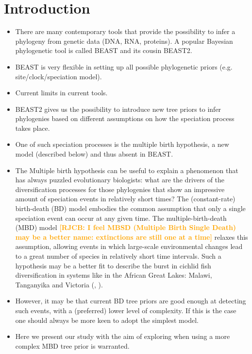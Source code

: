 \documentclass{article}
\newcommand*\richel[1]{\textcolor{orange}{\textbf{[RJCB: #1]}}}
\begin{document}
\section{Introduction}
\begin{itemize}

\item There are many contemporary tools that provide the possibility to infer a phylogeny from genetic data (DNA, RNA, proteins). A popular Bayesian
phylogenetic tool is called BEAST and its cousin BEAST2.

\item BEAST is very flexible in setting up all possible phylogenetic priors (e.g. site/clock/speciation model).

\item Current limits in current tools.

\item BEAST2 gives us the possibility to introduce new tree priors to infer phylogenies based on different assumptions on how the speciation process
takes place.

\item One of such speciation processes is the multiple birth hypothesis,
a new model (described below) and thus absent in BEAST.

\item The Multiple birth hypothesis can be useful to explain a phenomenon that has always puzzled evolutionary biologists: what are the drivers of the diversification processes for those phylogenies that show an impressive amount of speciation events in relatively short times? 
The (constant-rate) birth-death (BD) model embodies the common assumption that 
only a single speciation event can occur at any given time.
The multiple-birth-death (MBD) model \richel{I feel MBSD (Multiple Birth Single Death) may be a better name: extinctions are still one at a time} relaxes this assumption, allowing events in which 
large-scale environmental changes lead to a great number of species 
in relatively short time intervals. Such a hypothesis may be a better fit to describe the burst in cichlid fish diversification in systems like in the 
African Great Lakes: Malawi, Tanganyika and Victoria (\cite{janzen2016}, \cite{janzen2017}).

\item However, it may be that current BD tree priors are good enough at detecting such events, with a (preferred) lower level of complexity. If this is the case one should always be more keen to adopt the simplest model.

\item Here we present our study with the aim of exploring when using a more complex MBD tree prior is warranted.

\end{itemize}
\end{document}
